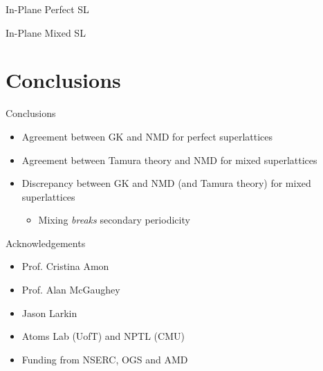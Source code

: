 \documentclass{beamer}
\begin{document}
\begin{frame}{In-Plane Perfect SL}
\begin{figure}[t]
\begin{center}
\vspace*{-0.8cm}
\renewcommand{\figure}{Fig.}
\label{fig:ip}
\end{center}
\end{figure}
\end{frame}

\begin{frame}{In-Plane Mixed SL}
\begin{figure}[t]
\begin{center}
\vspace*{-0.8cm}
\renewcommand{\figure}{Fig.}
\label{fig:ip_all}
\end{center}
\end{figure}
\end{frame}

\section{Conclusions}
\begin{frame}{Conclusions}
\begin{itemize}
\item Agreement between GK and NMD for perfect superlattices
\item Agreement between Tamura theory and NMD for mixed superlattices
\item Discrepancy between GK and NMD (and Tamura theory) for mixed superlattices
\begin{itemize}
\item Mixing \textit{breaks} secondary periodicity
\end{itemize}
\end{itemize}
\end{frame}


\begin{frame}{Acknowledgements}
\begin{itemize}
\item Prof. Cristina Amon
\item Prof. Alan McGaughey
\item Jason Larkin
\item Atoms Lab  (UofT) and NPTL (CMU)
\item Funding from NSERC, OGS and AMD
\end{itemize}
\end{frame}
\end{document}
